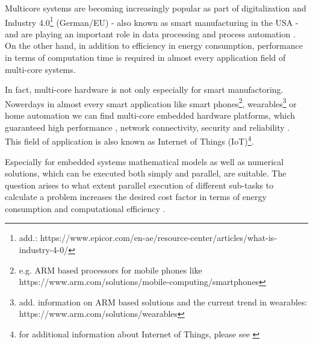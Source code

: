 Multicore systems are becoming increasingly popular as part of digitalization and Industry 4.0\footnote{ add.: https://www.epicor.com/en-ae/resource-center/articles/what-is-industry-4-0/} (German/EU) \parencite{internet5} \parencite[or][]{article13} - also known as smart manufacturing in the USA \parencite[see][p1]{article12} - and are playing an important role in data processing and process automation \parencite[see][p294]{inproceedings3} \parencite[or][p1]{article11}. On the other hand, in addition to efficiency in energy consumption, performance in terms of computation time \parencite[see][p294]{inproceedings3} is required in almost every application field of multi-core systems.

In fact, multi-core hardware is not only especially for smart manufactoring. Nowerdays in almost every smart application like smart phones\footnote{ e.g. ARM based processors for mobile phones like https://www.arm.com/solutions/mobile-computing/smartphones}, wearables\footnote{ add. information on ARM based solutions and the current trend in wearables: https://www.arm.com/solutions/wearables} or home automation we can find multi-core embedded hardware platforms, which guaranteed high performance \parencite[see][p7]{article15}, network connectivity, security and reliability \parencite[see][p5]{article16}. This field of application is also known as Internet of Things (IoT)\footnote{ for additional information about Internet of Things, please see \parencite[][]{article17}}.

Especially for embedded systems mathematical models as well as numerical solutions, which can be executed both simply and parallel, are suitable. The question arises to what extent parallel execution of different sub-tasks to calculate a problem \parencite[see][p4]{article14} increases the desired cost factor in terms of energy consumption \parencite[see][chapter 3]{inproceedings4} and computational efficiency \parencite[see][p4 Figure 3]{article14}.